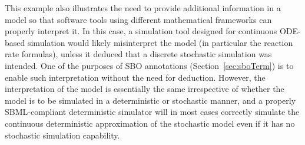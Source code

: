 
This example also illustrates the need to provide additional
information in a model so that software tools using different
mathematical frameworks can properly interpret it.  In this case,
a simulation tool designed for continuous ODE-based simulation
would likely misinterpret the model (in particular the reaction
rate formulas), unless it deduced that a discrete stochastic
simulation was intended.  One of the purposes of SBO annotations
(Section~\ref{sec:sboTerm}) is to enable such interpretation
without the need for deduction. However, the interpretation of the
model is essentially the same irrespective of whether the model is
to be simulated in a deterministic or stochastic manner, and a
properly SBML-compliant deterministic simulator will in most cases
correctly simulate the continuous deterministic approximation
of the stochastic model even if it has no stochastic simulation
capability.

\clearpage

